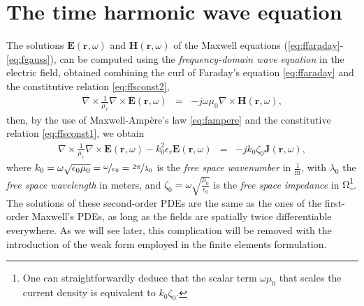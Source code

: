 \section{The time harmonic wave equation} %

\par The solutions ${\mathbf{E}}(\mathbf{r},\omega)$ and ${\mathbf{H}}(\mathbf{r},\omega)$ of the Maxwell equations (\ref{eq:ffaraday}-\ref{eq:fgauss}), can be computed using the \textit{frequency-domain wave equation} in the electric field, obtained combining the curl of Faraday's equation \eqref{eq:ffaraday} and the constitutive relation \eqref{eq:ffsconst2},
\begin{eqnarray}
\nabla \times \frac{1}{\mu_r} \nabla \times {\mathbf{E}}(\mathbf{r},\omega) &= & - j\omega\mu_0 \nabla \times {\mathbf{H}}(\mathbf{r},\omega), 
\end{eqnarray}
\noindent then, by the use of Maxwell-Amp\`ere's law \eqref{eq:fampere} and the constitutive relation \eqref{eq:ffsconst1}, we obtain
\begin{eqnarray}
\nabla \times \frac{1}{\mu_r} \nabla \times {\mathbf{E}}(\mathbf{r},\omega) - k_0^2 \epsilon_r {\mathbf{E}}(\mathbf{r},\omega) &= & - jk_0\zeta_0{\mathbf{J}}(\mathbf{r},\omega),  \label{eq:waveE}
\end{eqnarray}
where $k_0 = \omega \sqrt{\epsilon_0 \mu_0} = \nicefrac{\omega}{c_0} = \nicefrac{2\pi}{\lambda_0}$ is the \textit{free space wavenumber} in $\frac{1}{\mathrm{m}}$, with $\lambda_0$ the \textit{free space wavelength} in meters, and $\zeta_0 = \omega \sqrt{\frac{\mu_0}{\epsilon_0}}$ is the \textit{free space impedance} in $\mathrm{\Omega}$\footnote{One can straightforwardly deduce that the scalar term $\omega \mu_0$ that scales the current density is equivalent to $k_0 \zeta_0$.}. The solutions of these second-order PDEs are the same as the ones of the first-order Maxwell's PDEs, as long as the fields are spatially twice differentiable everywhere. As we will see later, this complication will be removed with the introduction of the weak form employed in the finite elements formulation.

